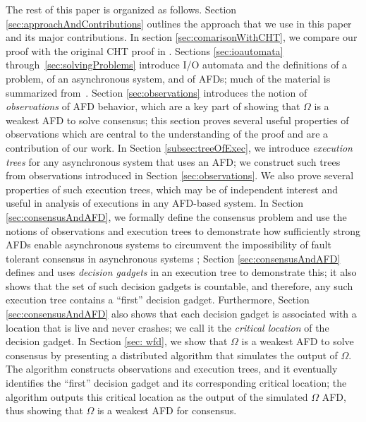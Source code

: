 \documentclass[11pt]{article}
\numberwithin{theorem}{section}
\begin{document}
The rest of this paper is organized as follows. Section \ref{sec:approachAndContributions} outlines the approach that we use in this paper and its major contributions. In section \ref{sec:comarisonWithCHT}, we compare our proof with the original CHT proof in \cite{chan:twfdf}. Sections \ref{sec:ioautomata} through~\ref{sec:solvingProblems} introduce I/O automata and the definitions of a problem, of an asynchronous system, and of AFDs; much of the material is summarized
from~\cite{cornejoetalAFD,cornejoetalAFD-TR}. Section \ref{sec:observations} introduces the notion of \emph{observations} of AFD behavior, which are a key part of showing that $\Omega$ is a weakest AFD to solve consensus; this section proves several useful properties of observations which are central to the understanding of the proof and are a contribution of our work. In Section \ref{subsec:treeOfExec}, we introduce \emph{execution trees} for any asynchronous system that uses an AFD; we construct such trees from observations introduced in Section \ref{sec:observations}. We also prove several properties of such execution trees, which may be of independent interest and useful in analysis of executions in any AFD-based system. In Section \ref{sec:consensusAndAFD}, we formally define the consensus problem and use the notions of observations and execution trees to demonstrate how sufficiently strong AFDs enable asynchronous systems to circumvent the impossibility of fault tolerant consensus in asynchronous systems \cite{FLP}; Section \ref{sec:consensusAndAFD} defines and uses \emph{decision gadgets} in an execution tree to demonstrate this; it also shows that the set of such decision gadgets is countable, and therefore, any such execution tree contains a ``first'' decision gadget. Furthermore, Section \ref{sec:consensusAndAFD} also shows that each decision gadget is associated with a location that is live and never crashes; we call it the \emph{critical location} of the decision gadget. In Section \ref{sec: wfd}, we show that $\Omega$ is a weakest AFD to solve consensus by presenting a distributed algorithm that simulates the output of $\Omega$. The algorithm constructs observations and execution trees, and it eventually identifies the ``first'' decision gadget and its corresponding critical location; the algorithm outputs this critical location as the output of the simulated $\Omega$ AFD, thus showing that $\Omega$ is a weakest AFD for consensus. 
\end{document}
